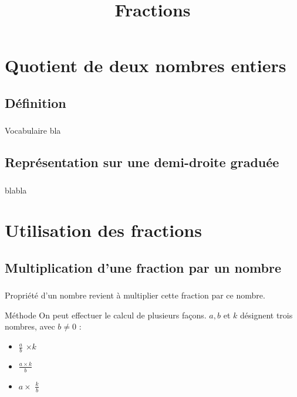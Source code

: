 \documentclass{beamer}
\title{Fractions}
\author{}\institute{}
\begin{document}
	
	
	
\begin{frame}
	\titlepage
\end{frame}

\section{Quotient de deux nombres entiers}

\subsection{Définition}


\begin{frame}
\frametitle{}  
\framesubtitle{ }	
	
\begin{block}{Vocabulaire}
	bla
\end{block}	

\end{frame}


\subsection{Représentation sur une demi-droite graduée}
\begin{frame}
	\frametitle{}  
	\framesubtitle{ }	
	
	blabla
	
\end{frame}


\section{Utilisation des fractions}

\subsection{Multiplication d'une fraction par un nombre}

\begin{frame}
	\frametitle{}  
	\framesubtitle{}	
	
	\begin{block}{Propriété}
		 d'un nombre revient à multiplier cette fraction par ce nombre.	
	\end{block}
	
	\begin{block}{Méthode}
		On peut effectuer le calcul de plusieurs façons.
		$a, b$ et $k$ désignent trois nombres, avec $b \neq 0$ :
		\begin{itemize}
			\item[\ ] {\Large $\frac{a}{b}$} $\times k$
			\item[ou] {\Large $\frac{a \times k}{b}$}
			\item[ou] $a \times $ {\Large $\frac{k}{b}$}
		\end{itemize}
	\end{block}
			
\end{frame}
\end{document}
